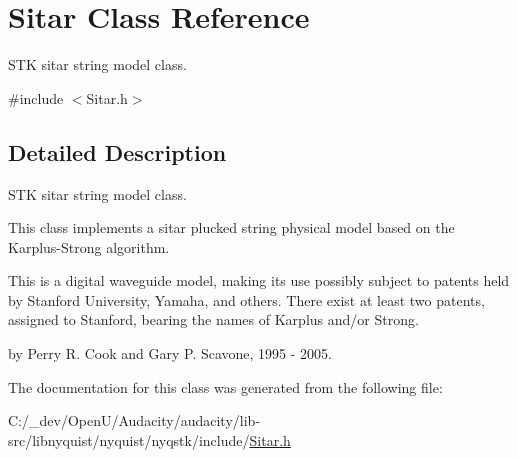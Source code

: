 \hypertarget{class_sitar}{}\section{Sitar Class Reference}
\label{class_sitar}


S\+TK sitar string model class.  




{\ttfamily \#include $<$Sitar.\+h$>$}



\subsection{Detailed Description}
S\+TK sitar string model class. 

This class implements a sitar plucked string physical model based on the Karplus-\/\+Strong algorithm.

This is a digital waveguide model, making its use possibly subject to patents held by Stanford University, Yamaha, and others. There exist at least two patents, assigned to Stanford, bearing the names of Karplus and/or Strong.

by Perry R. Cook and Gary P. Scavone, 1995 -\/ 2005. 

The documentation for this class was generated from the following file\+:\begin{DoxyCompactItemize}
\item 
C\+:/\+\_\+dev/\+Open\+U/\+Audacity/audacity/lib-\/src/libnyquist/nyquist/nyqstk/include/\hyperlink{_sitar_8h}{Sitar.\+h}\end{DoxyCompactItemize}
